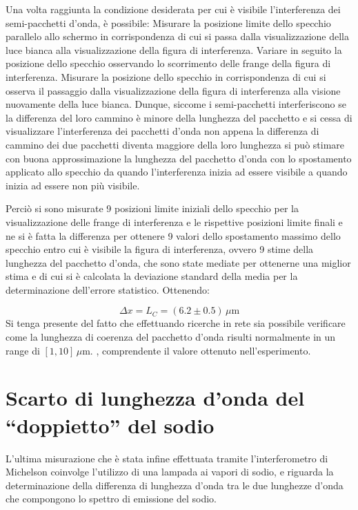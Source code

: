 \documentclass[a4paper,12pt]{article}
\begin{document}
Una volta raggiunta la condizione desiderata per cui è visibile l’interferenza dei semi-pacchetti d’onda, è possibile: 
Misurare la posizione limite dello specchio parallelo allo schermo in corrispondenza di cui si passa dalla visualizzazione della luce bianca alla visualizzazione della figura di interferenza. 
Variare in seguito la posizione dello specchio osservando lo scorrimento delle frange della figura di interferenza.
Misurare la posizione dello specchio in corrispondenza di cui si osserva il passaggio dalla visualizzazione della figura di interferenza alla visione nuovamente della luce bianca. 
Dunque, siccome i semi-pacchetti interferiscono se la differenza del loro cammino è minore della lunghezza del pacchetto e si cessa di visualizzare l’interferenza dei pacchetti d’onda non appena la differenza di cammino dei due pacchetti diventa maggiore della loro lunghezza si può stimare con buona approssimazione la lunghezza del pacchetto d’onda con lo spostamento applicato allo specchio da quando l’interferenza inizia ad essere visibile a quando inizia ad essere non più visibile. 

Perciò si sono misurate 9 posizioni limite iniziali dello specchio per la visualizzazione delle frange di interferenza e le rispettive posizioni limite finali e ne si è fatta la differenza per ottenere 9 valori dello spostamento massimo dello specchio entro cui è visibile la figura di interferenza, ovvero 9 stime della lunghezza del pacchetto d’onda, che sono state mediate per ottenerne una miglior stima e di cui si è calcolata la deviazione standard della media per la determinazione dell’errore statistico. 
Ottenendo: 

\begin{equation}
\Delta x = L_C = (6.2 \pm 0.5) \, \mu\text{m}
\label{eq:lunghezza_coerenza}
\end{equation}
Si tenga presente del fatto che effettuando ricerche in rete sia possibile verificare come la lunghezza di coerenza del pacchetto d’onda risulti normalmente in un range di 
\([1, 10] \, \mu\text{m}.\) , comprendente il valore ottenuto nell’esperimento. 
 
\section{Scarto di lunghezza d’onda del “doppietto” del sodio}

L’ultima misurazione che è stata infine effettuata tramite l’interferometro di Michelson coinvolge l’utilizzo di una lampada ai vapori di sodio, e riguarda la determinazione della differenza di lunghezza d’onda tra le due lunghezze d’onda che compongono lo spettro di emissione del sodio.
\end{document}
